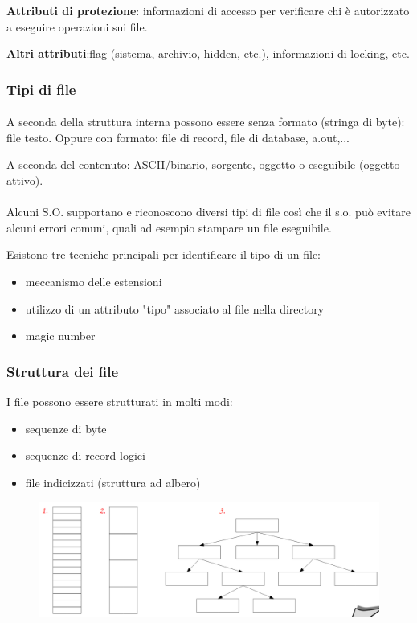 \textbf{Attributi di protezione}: informazioni di accesso per verificare chi è autorizzato a eseguire operazioni sui file.

\textbf{Altri attributi}:flag (sistema, archivio, hidden, etc.), informazioni di locking, etc.

\subsubsection{Tipi di file}
\paragraph{}
A seconda della struttura interna possono essere senza formato (stringa di byte): file testo. Oppure con formato: file di record, file di database, a.out,...

A seconda del contenuto: ASCII/binario, sorgente, oggetto o eseguibile (oggetto attivo).

\paragraph{}
Alcuni S.O. supportano e riconoscono diversi tipi di file così che il s.o. può evitare alcuni errori comuni, quali ad esempio stampare un file eseguibile.

Esistono tre tecniche principali per identificare il tipo di un
file:
\begin{itemize}
    \item meccanismo delle estensioni
    \item  utilizzo di un attributo "tipo" associato al file nella directory
    \item magic number
\end{itemize}

\subsubsection{Struttura dei file}
I file possono essere strutturati in molti modi:
\begin{itemize}
    \item sequenze di byte
    \item sequenze di record logici
    \item file indicizzati (struttura ad albero)
\end{itemize}

\begin{figure} [h]
    \centering
    \includegraphics[width=0.7\linewidth]{Images/Screenshot 2025-01-18 at 15-45-24 so-07-filesystem.pdf.png}
\end{figure}

